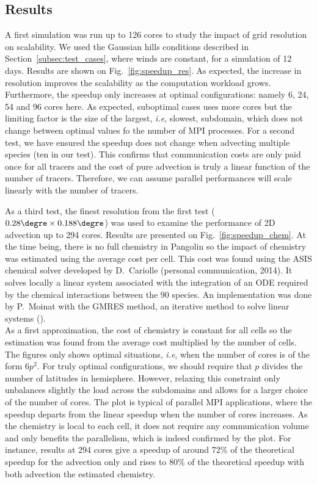 \subsection{Results} \label{subsec:results} A first simulation was run up to 126
cores to study the impact of grid resolution on scalability. We used the
Gaussian hills conditions described in Section~\ref{subsec:test_cases}, where
winds are constant, for a simulation of 12 days. Results are shown on
Fig.~\ref{fig:speedup_res}. As expected, the increase in resolution improves the
scalability as the computation workload grows. Furthermore, the speedup only
increases at optimal configurations: namely 6, 24, 54 and 96 cores here. As
expected, suboptimal cases uses more cores but the limiting factor is the size
of the largest, \textit{i.e}, slowest, subdomain, which does not change between
optimal values fo the number of MPI processes.  For a second test, we have
ensured the speedup does not change when advecting multiple species (ten in our
test). This confirms that communication costs are only paid once for all tracers
and the cost of pure advection is truly a linear function of the number of
tracers. Therefore, we can assume parallel performances will scale linearly
with the number of tracers.

As a third test, the finest resolution from the first test
($0.28{\degre}\times0.188\degre$) was used to examine the performance of 2D
advection up to 294 cores. Results are presented on Fig.~\ref{fig:speedup_chem}.
At the time being, there is no full chemistry in Pangolin so the impact of
chemistry was estimated using the average cost per cell. This cost was found
using the ASIS chemical solver developed by D.~Cariolle (personal communication,
2014). It solves locally a linear system associated with the integration of an
\gls{ODE} required by the chemical interactions between the 90 species. An
implementation was done by P.~Moinat with the GMRES method, an iterative method
to solve linear systems (\cite{Saad1986}). \\
As a first approximation, the cost of chemistry is constant for all cells so the
estimation was found from the average cost multiplied by the number of cells.
The figures only shows optimal situations, \textit{i.e}, when the number of
cores is of the form $6p^2$.  For truly optimal configurations, we should
require that $p$ divides the number of latitudes in hemisphere. However,
relaxing this constraint only unbalances slightly the load across the subdomains
and allows for a larger choice of the number of cores.  The plot is typical of
parallel MPI applications, where the speedup departs from the linear speedup
when the number of cores increases. As the chemistry is local to each cell, it does
not require any communication volume and only benefits the parallelism, which is
indeed confirmed by the plot. For instance, results at 294 cores give a speedup
of around 72\% of the theoretical speedup for the advection only and rises to
80\% of the theoretical speedup with both advection the estimated chemistry. 

